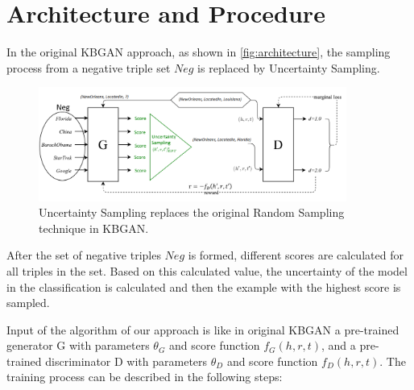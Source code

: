 
\section{Architecture and Procedure} \label{sec:architecture_and_procedure}
In the original \ac{KBGAN} approach, as shown in \autoref{fig:architecture}, the sampling process from a negative triple set $Neg$ is replaced by Uncertainty Sampling.
\begin{figure}[t]
  \centering
    \includegraphics[width=0.90\textwidth]{figures/architecture.png}
  \caption{Uncertainty Sampling replaces the original Random Sampling technique in \ac{KBGAN}.}
  \label{fig:architecture}
\end{figure}
After the set of negative triples $Neg$ is formed, different scores are calculated for all triples in the set.
Based on this calculated value, the uncertainty of the model in the classification is calculated and then the example with the highest score is sampled. 

Input of the algorithm of our approach is like in original \ac{KBGAN} a pre-trained generator G with parameters $\theta_G$ and score function $f_G(h,r,t)$, 
and a pre-trained discriminator D with parameters $\theta_D$ and score function $f_D(h,r,t)$.
The training process can be described in the following steps:

